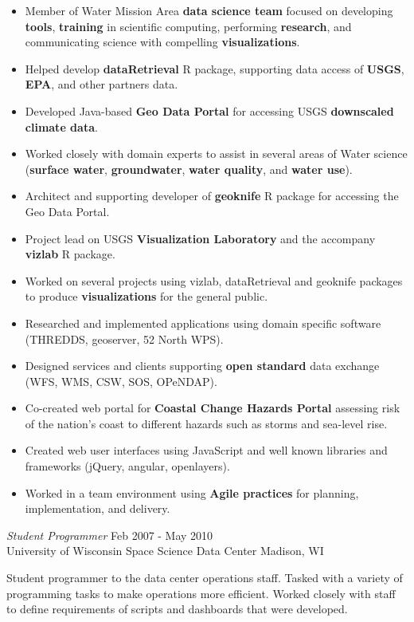 \documentclass[line,margin]{res}
\begin{document}
\begin{resume}
	     \begin{itemize} \itemsep -2pt %
		\item Member of Water Mission Area \textbf{data science team} focused on developing \textbf{tools}, \textbf{training} in scientific computing, performing \textbf{research}, and communicating science with compelling \textbf{visualizations}.
		\item Helped develop \textbf{dataRetrieval} R package, supporting data access of \textbf{USGS}, \textbf{EPA}, and other partners data.
		\item Developed Java-based \textbf{Geo Data Portal} for accessing USGS \textbf{downscaled climate data}.
		\item Worked closely with domain experts to assist in several areas of Water science (\textbf{surface water}, \textbf{groundwater}, \textbf{water quality}, and \textbf{water use}).
		\item Architect and supporting developer of \textbf{geoknife} R package for accessing the Geo Data Portal.
		\item Project lead on USGS \textbf{Visualization Laboratory} and the accompany \textbf{vizlab} R package.
		\item Worked on several projects using vizlab, dataRetrieval and geoknife packages to produce \textbf{visualizations} for the general public.
		\item Researched and implemented applications using domain specific software (THREDDS, geoserver, 52 North WPS).
		\item Designed services and clients supporting \textbf{open standard} data exchange (WFS, WMS, CSW, SOS, OPeNDAP).
		\item Co-created web portal for \textbf{Coastal Change Hazards Portal} assessing risk of the nation's coast to different hazards such as storms and sea-level rise.
		\item Created web user interfaces using JavaScript and well known libraries and frameworks (jQuery, angular, openlayers).
		\item Worked in a team environment using \textbf{Agile practices} for planning, implementation, and delivery.
	     \end{itemize}
		{\sl Student Programmer} \hfill Feb 2007 - May 2010 \\
		University of Wisconsin Space Science Data Center \hfill Madison, WI
                
		Student programmer to the data center operations staff.  Tasked with a variety of programming tasks to make operations more efficient.  Worked closely with staff to define requirements of scripts and dashboards that were developed.


\end{resume}
\end{document}
